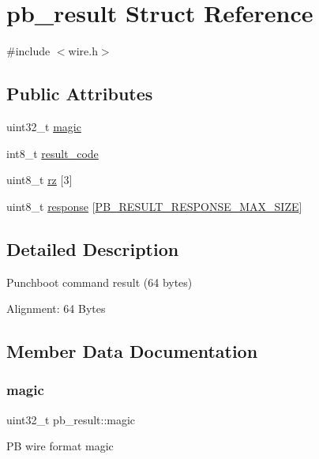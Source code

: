 \hypertarget{structpb__result}{}\section{pb\+\_\+result Struct Reference}
\label{structpb__result}


{\ttfamily \#include $<$wire.\+h$>$}

\subsection*{Public Attributes}
\begin{DoxyCompactItemize}
\item 
uint32\+\_\+t \hyperlink{structpb__result_abf4b5c5730a4fc7ac3fdb1ed70a412f1}{magic}
\item 
int8\+\_\+t \hyperlink{structpb__result_aae39409d9cd1da2a390d2666e1f35450}{result\+\_\+code}
\item 
uint8\+\_\+t \hyperlink{structpb__result_a7ae704b210b447ff4c3f647158d3e4a4}{rz} \mbox{[}3\mbox{]}
\item 
uint8\+\_\+t \hyperlink{structpb__result_adc7cc4fe0149d564e39733ffeb96bfe7}{response} \mbox{[}\hyperlink{wire_8h_a2e780e3a8957b04e0dd4bc78cd595551}{P\+B\+\_\+\+R\+E\+S\+U\+L\+T\+\_\+\+R\+E\+S\+P\+O\+N\+S\+E\+\_\+\+M\+A\+X\+\_\+\+S\+I\+ZE}\mbox{]}
\end{DoxyCompactItemize}


\subsection{Detailed Description}
Punchboot command result (64 bytes)

Alignment\+: 64 Bytes 

\subsection{Member Data Documentation}
\mbox{\label{structpb__result_abf4b5c5730a4fc7ac3fdb1ed70a412f1}} 
\subsubsection{\texorpdfstring{magic}{magic}}
{\footnotesize\ttfamily uint32\+\_\+t pb\+\_\+result\+::magic}

PB wire format magic \mbox{\label{structpb__result_adc7cc4fe0149d564e39733ffeb96bfe7}} 
